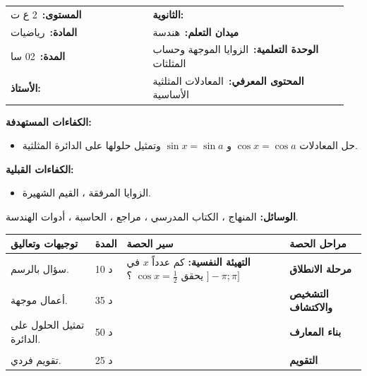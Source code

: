 \documentclass[12pt,a4paper]{article}
\makeatletter
\newenvironment{LTR}{\begin{otherlanguage}{english}}{\end{otherlanguage}}
\newcommand{\ar}[1]{\foreignlanguage{arabic}{#1}}
\newcommand{\Phase}[1]{\textbf{#1}}
\newcommand{\Fld}[2]{\textbf{#1:}\ #2}
\newcommand{\ModhHead}[9]{%
\begin{LTR}
\begin{tcolorbox}[enhanced,colback=white,colframe=cThm!85!black,arc=4mm,boxrule=1pt,top=14pt,bottom=6pt,left=8pt,right=8pt,
 overlay={\node[fill=cThm!85!black,text=white,rounded corners=3mm,inner xsep=14pt,inner ysep=4pt,font=\large\bfseries] at ([yshift=0pt]frame.north){\ar{مذكرة رقم #1}};},
 before upper={\selectlanguage{arabic}}]
\begin{tabular}{@{}p{0.4\linewidth}p{0.55\linewidth}@{}}
\Fld{المستوى}{#2} & \Fld{الثانوية}{\dotfill}\\[3pt]
\Fld{المادة}{رياضيات} & \Fld{ميدان التعلم}{#3}\\[3pt]
\Fld{المدة}{#5} & \Fld{الوحدة التعلمية}{#4}\\[3pt]
\Fld{الأستاذ}{\dotfill} & \Fld{المحتوى المعرفي}{#6}\\
\end{tabular}
\end{tcolorbox}
\begin{tcolorbox}[enhanced,colback=white,colframe=cThm!85!black,arc=3mm,boxrule=0.8pt,sidebyside,sidebyside align=top,lefthand ratio=0.5,
 segmentation style={dashed,cThm!60},before upper={\selectlanguage{arabic}},before lower={\selectlanguage{arabic}}]
\textbf{الكفاءات المستهدفة:}\par #8
\tcblower
\textbf{الكفاءات القبلية:}\par #7
\end{tcolorbox}
\end{LTR}
\par\smallskip\textbf{الوسائل:} #9\par\smallskip}
\newenvironment{Sayr}{%
\begin{LTR}\renewcommand{\arraystretch}{1.25}
\begin{longtable}{|p{0.17\textwidth}|>{\centering\arraybackslash}p{0.06\textwidth}|p{0.53\textwidth}|>{\centering\arraybackslash}p{0.12\textwidth}|}
\hline\rowcolor{cThm!12}\ar{\textbf{توجيهات وتعاليق}} & \ar{\textbf{المدة}} & \ar{\textbf{سير الحصة}} & \ar{\textbf{مراحل الحصة}}\\\hline\endhead
\hline\endfoot}{\end{longtable}\end{LTR}}
\newcommand{\Row}[4]{\ar{\small #4} & \ar{#3} & \ar{#2} & \cellcolor{cThm!8}\ar{\Phase{#1}}\\\hline}
\newcommand{\Lab}[2]{\foreignlanguage{english}{\tcbox[on line,colback=#1,colframe=#1,boxrule=0pt,arc=2pt,boxsep=1pt,left=5pt,right=5pt,top=1pt,bottom=1pt]{\ar{\textcolor{white}{\textbf{#2}}}}}}
\newcommand{\ck}{\ensuremath{{\color{cRem}\checkmark}}}
\makeatother
\begin{document}
\newpage
\ModhHead{41}{2 ع ت}{هندسة}{الزوايا الموجهة وحساب المثلثات}{02 سا}{المعادلات المثلثية الأساسية}%
{\begin{itemize}\item الزوايا المرفقة ، القيم الشهيرة.\end{itemize}}%
{\begin{itemize}\item حل المعادلات $\cos x=\cos a$ و $\sin x=\sin a$ وتمثيل حلولها على الدائرة المثلثية.\end{itemize}}%
{المنهاج ، الكتاب المدرسي ، مراجع ، الحاسبة ، أدوات الهندسة.}
\begin{Sayr}
\Row{مرحلة الانطلاق}{%
\textbf{التهيئة النفسية:} كم عدداً $x$ في $]-\pi;\pi]$ يحقق $\cos x=\frac12$ ؟}{10 د}{سؤال بالرسم.}
\Row{التشخيص والاكتشاف}{%
\Lab{cEx}{مناقشة أعمال موجهة صفحة 222}\par\ck\ المستقيم $x=\frac12$ يقطع الدائرة المثلثية في نقطتين: المرفقتين بـ $\frac\pi3$ و $-\frac\pi3$.\par
}{35 د}{أعمال موجهة.}
\Row{بناء المعارف}{%
\Lab{cThm}{خاصية}\par\ck\ $\cos x=\cos a$ يكافئ $x=a+2k\pi$ أو $x=-a+2k\pi$ ($k\in\mathbb Z$).\par
\ck\ $\sin x=\sin a$ يكافئ $x=a+2k\pi$ أو $x=\pi-a+2k\pi$.\par
\Lab{cEx}{مثال}\par\ck\ $\sin x=\frac{\sqrt2}2$ في $[0;2\pi[$: $x=\frac\pi4$ أو $x=\frac{3\pi}4$.\par
\ck\ $\cos2x=0=\cos\frac\pi2$: $2x=\pm\frac\pi2+2k\pi$ ، $x=\pm\frac\pi4+k\pi$ ؛ في $]-\pi;\pi]$: $-\frac{3\pi}4$ ، $-\frac\pi4$ ، $\frac\pi4$ ، $\frac{3\pi}4$.\par
}{50 د}{تمثيل الحلول على الدائرة.}
\Row{}{%
\Lab{cMeth}{طريقة}\ نكتب الطرف الثاني على شكل $\cos a$ أو $\sin a$ ، نحل ، ثم نختار حلول المجال المطلوب.\par\Lab{cThm!80!black}{حذار}\ في $\cos2x$: نقسم $2k\pi$ على $2$ أيضاً.}{}{}
\Row{التقويم}{%
\Lab{cEx}{تطبيق}\par حل في $]-\pi;\pi]$: $\sin x=-\frac12$.\par\textbf{الحل:} $\sin x=\sin(-\frac\pi6)$: $x=-\frac\pi6+2k\pi$ أو $x=\frac{7\pi}6+2k\pi$ ؛ الحلول $-\frac\pi6$ و $-\frac{5\pi}6$.\par\textbf{واجب منزلي:} تمارين 51 ، 56 ، 57 ، 61 ، 62 ، 76 ، 77 من باب الزوايا الموجهة.\par\smallskip\textbf{ملاحظات حول سير الحصة:} \dotfill}{25 د}{تقويم فردي.}
\end{Sayr}
\newpage
{}%
\end{document}
